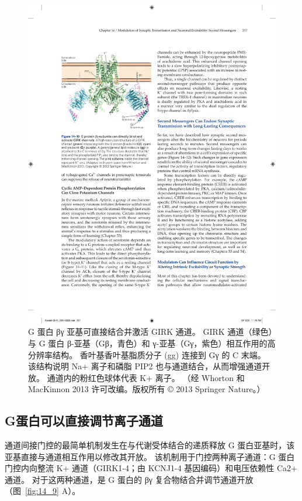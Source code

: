 \begin{figure}[htbp]
	\centering
	\includegraphics[width=0.5\linewidth]{chap14/fig_14_10}
	\caption{G 蛋白 βγ 亚基可直接结合并激活 GIRK 通道。 GIRK 通道（绿色）与 G 蛋白 β-亚基（Gβ，青色）和 γ-亚基（Gγ，紫色）相互作用的高分辨率结构。 香叶基香叶基脂质分子 (gg) 连接到 Gγ 的 C 末端。 该结构说明 Na+ 离子和磷脂 PIP2 也与通道结合，从而增强通道开放。 通道内的粉红色球体代表 K+ 离子。 （经 Whorton 和 MacKinnon 2013 许可改编。版权所有 © 2013 Springer Nature。）}
	\label{fig:14_10}
\end{figure}



\subsection{G蛋白可以直接调节离子通道}

通道间接门控的最简单机制发生在与代谢受体结合的递质释放 G 蛋白亚基时，该亚基直接与通道相互作用以修改其开放。
该机制用于门控两种离子通道：G 蛋白门控内向整流 K+ 通道（GIRK1-4；由 KCNJ1-4 基因编码）和电压依赖性 Ca2+ 通道。
对于这两种通道，是 G 蛋白的 βγ 复合物结合并调节通道开放（图~\ref{fig:14_9} A）。


